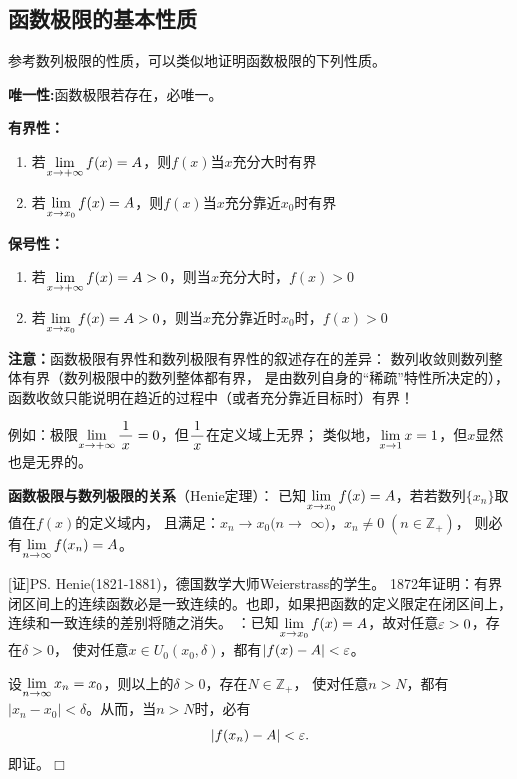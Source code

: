 \subsection{函数极限的基本性质}

参考数列极限的性质，可以类似地证明函数极限的下列性质。

\begin{thx}
	{\bf 唯一性:}函数极限若存在，必唯一。
	
	{\bf 有界性：}
	\begin{enumerate}[(1)]
	  \item 若$\lim\limits_{x\to{+\infty}}f(x)=A$，则$f(x)$当$x$充分大时有界
	  \item 若$\lim\limits_{x\to{x_0}}f(x)=A$，则$f(x)$当$x$充分靠近$x_0$时有界
	\end{enumerate}
	{\bf 保号性：}
	\begin{enumerate}[(1)]
	  \item 若$\lim\limits_{x\to{+\infty}}f(x)=A>0$，则当$x$充分大时，$f(x)>0$
	  \item 若$\lim\limits_{x\to{x_0}}f(x)=A>0$，则当$x$充分靠近时$x_0$时，$f(x)>0$
	\end{enumerate}
\end{thx}

{\bf 注意：}函数极限有界性和数列极限有界性的叙述存在的差异：
数列收敛则数列整体有界（数列极限中的数列整体都有界，
是由数列自身的“稀疏”特性所决定的），
函数收敛只能说明在趋近的过程中（或者充分靠近目标时）有界！

例如：极限$\lim\limits_{x\to{+\infty}}\displaystyle\frac{\,{1}\,}{\,{x}\,}=0$，但$\displaystyle\frac{\,{1}\,}{\,{x}\,}$在定义域上无界；
类似地，$\lim\limits_{x\to{1}}x=1$，但$x$显然也是无界的。

\begin{thx}
	{\bf 函数极限与数列极限的关系}（{\kaishu Henie定理}）：
	已知$\lim\limits_{x\to{x_0}}f(x)=A$，若若数列$\{x_n\}$取值在$f(x)$的定义域内，
	且满足：$x_n\to x_0(n\to$ $\infty)$，$x_n\ne 0\;(n\in\mathbb{Z}_+)$，
	则必有$\lim\limits_{n\to\infty} f(x_n)=A$。
\end{thx}

[证]\ps{Henie(1821-1881)，德国数学大师Weierstrass的学生。
1872年证明：有界闭区间上的连续函数必是一致连续的。也即，如果把函数的定义限定在闭区间上，
连续和一致连续的差别将随之消失。} 
：已知$\lim\limits_{x\to{x_0}}f(x)=A$，故对任意$\varepsilon>0$，存在$\delta>0$，
使对任意$x\in U_0(x_0,\delta)$，都有$|f(x)-A|<\varepsilon$。

设$\lim\limits_{n\to\infty} x_n=x_0$，则以上的$\delta>0$，存在$N\in\mathbb{Z}_+$，
使对任意$n>N$，都有$|x_n-x_0|<\delta$。从而，当$n>N$时，必有
$$|f(x_n)-A|<\varepsilon.$$
即证。\hfill $\Box$

